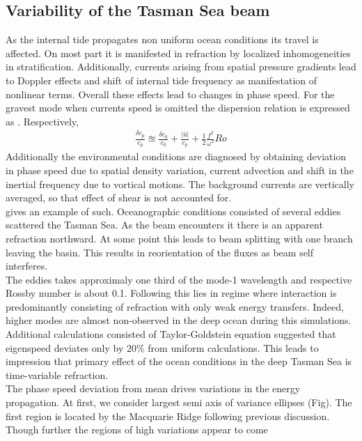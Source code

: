 \documentclass[12pt]{article}
\begin{document}
\subsection{Variability of the Tasman Sea beam}
As the internal tide propagates non uniform ocean conditions its travel is affected. On most part 
it is manifested in refraction by localized inhomogeneities in stratification. Additionally, 
currents arising from spatial pressure gradients lead to Doppler effects and shift of internal tide 
frequency as manifestation of nonlinear terms. Overall these effects lead to changes in phase 
speed. For the gravest mode when currents speed is omitted the dispersion relation is expressed as
\citep{zaron2014time}. Respectively, 
\begin{align}
\frac{\delta c_p}{c_p} \approxeq \frac{\delta c_0}{c_0} + \frac{|\bar{u}|}{c_p} + \frac{1}{2} 
\frac{f^2}{\omega^2} Ro
\end{align}
Additionally the environmental conditions are diagnosed by obtaining deviation in phase speed due 
to spatial density variation, current advection and shift in the inertial frequency due to vortical 
motions. The background currents are vertically averaged, so that effect of shear is not accounted 
for.\\
 gives an example of such. Oceanographic conditions consisted 
of several eddies scattered the Tasman Sea. As the beam encounters it there is an apparent 
refraction northward. At some point this leads to beam splitting with one branch leaving the basin. 
This results in reorientation of the fluxes as beam self interferes.\\
The eddies takes approximaly one third of the mode-1 wavelength and respective Rossby number is 
about 0.1. Following \citep{dunphy2014focusing, dunphy2017low} this lies in regime where 
interaction is predominantly consisting of refraction with only weak energy transfers. Indeed, 
higher modes are almost non-observed in the deep ocean during this simulations. Additional 
calculations consisted of Taylor-Goldstein equation suggested that eigenspeed deviates only by 
$20\%$ from uniform calculations. This leads to impression that primary effect of the ocean 
conditions in the deep Tasman Sea is time-variable refraction.\\
The phase speed deviation from mean drives variations in the energy propagation. At first, we 
consider largest semi axis of variance ellipses (Fig). The first region is located by the Macquarie 
Ridge following previous discussion. Though further the regions of high variations appear to come 
\end{document}
